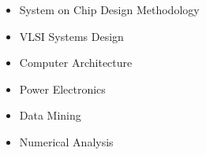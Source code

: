 \vspace{-5pt}
\divider

\begin{itemize}
\item System on Chip Design Methodology
\item VLSI Systems Design
\item Computer Architecture
\item Power Electronics
\item Data Mining
\item Numerical Analysis
\end{itemize}







